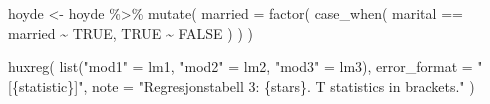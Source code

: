 \documentclass[
  12pt,
  norsk,
]{article}
\newenvironment{Shaded}{\begin{snugshade}}{\end{snugshade}}
\newcommand{\AttributeTok}[1]{\textcolor[rgb]{0.77,0.63,0.00}{#1}}
\newcommand{\ConstantTok}[1]{\textcolor[rgb]{0.00,0.00,0.00}{#1}}
\newcommand{\FunctionTok}[1]{\textcolor[rgb]{0.00,0.00,0.00}{#1}}
\newcommand{\NormalTok}[1]{#1}
\newcommand{\OtherTok}[1]{\textcolor[rgb]{0.56,0.35,0.01}{#1}}
\newcommand{\SpecialCharTok}[1]{\textcolor[rgb]{0.00,0.00,0.00}{#1}}
\newcommand{\StringTok}[1]{\textcolor[rgb]{0.31,0.60,0.02}{#1}}
\begin{document}
\begin{Shaded}
\begin{Highlighting}[]
\NormalTok{hoyde }\OtherTok{\textless{}{-}}\NormalTok{ hoyde }\SpecialCharTok{\%\textgreater{}\%} 
  \FunctionTok{mutate}\NormalTok{(}
    \AttributeTok{married =} \FunctionTok{factor}\NormalTok{(}
      \FunctionTok{case\_when}\NormalTok{(}
\NormalTok{        marital }\SpecialCharTok{==} \StringTok{\textquotesingle{}married\textquotesingle{}} \SpecialCharTok{\textasciitilde{}} \ConstantTok{TRUE}\NormalTok{, }\ConstantTok{TRUE} \SpecialCharTok{\textasciitilde{}} \ConstantTok{FALSE}
\NormalTok{      )}
\NormalTok{    )}
\NormalTok{  )}
\end{Highlighting}
\end{Shaded}

\begin{Shaded}
\begin{Highlighting}[]
\FunctionTok{huxreg}\NormalTok{(}
   \FunctionTok{list}\NormalTok{(}\StringTok{"mod1"} \OtherTok{=}\NormalTok{ lm1, }\StringTok{"mod2"} \OtherTok{=}\NormalTok{ lm2, }\StringTok{"mod3"} \OtherTok{=}\NormalTok{ lm3),}
   \AttributeTok{error\_format =} \StringTok{"[\{statistic\}]"}\NormalTok{,}
   \AttributeTok{note =} \StringTok{"Regresjonstabell 3: \{stars\}. T statistics in brackets."}
\NormalTok{   )}
\end{Highlighting}
\end{Shaded}

 
  \providecommand{\huxb}[2]{\arrayrulecolor[RGB]{#1}\global\arrayrulewidth=#2pt}
  \providecommand{\huxvb}[2]{\color[RGB]{#1}\vrule width #2pt}
  \providecommand{\huxtpad}[1]{\rule{0pt}{#1}}
  \providecommand{\huxbpad}[1]{\rule[-#1]{0pt}{#1}}
\end{document}
